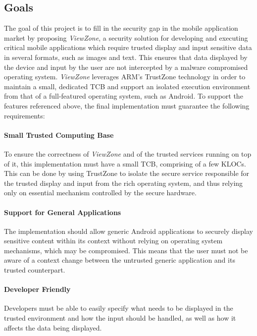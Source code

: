 \subsection{Goals}
The goal of this project is to fill in the security gap in the mobile application market by proposing \emph{ViewZone}, a security solution for developing and executing critical mobile applications which require trusted display and input sensitive data in several formats, such as images and text. This ensures that data displayed by the device and input by the user are not intercepted by a malware compromised operating system. \emph{ViewZone} leverages ARM's TrustZone technology in order to maintain a small, dedicated \ac{TCB} and support an isolated execution environment from that of a full-featured operating system, such as Android.
To support the features referenced above, the final implementation must guarantee the following requirements:

\paragraph*{\textbf{Small Trusted Computing Base\\}} To ensure the correctness of \emph{ViewZone} and of the trusted services running on top of it, this implementation must have a small \ac{TCB}, comprising of a few KLOCs. This can be done by using TrustZone to isolate the secure service responsible for the trusted display and input from the rich operating system, and thus relying only on essential mechanism controlled by the secure hardware.

\paragraph*{\textbf{Support for General Applications\\}} The implementation should allow generic Android applications to securely display sensitive content within its context without relying on operating system mechanisms, which may be compromised. This means that the user must not be aware of a context change between the untrusted generic application and its trusted counterpart.

\paragraph*{\textbf{Developer Friendly\\}} Developers must be able to easily specify what needs to be displayed in the trusted environment and how the input should be handled, as well as how it affects the data being displayed.\\

